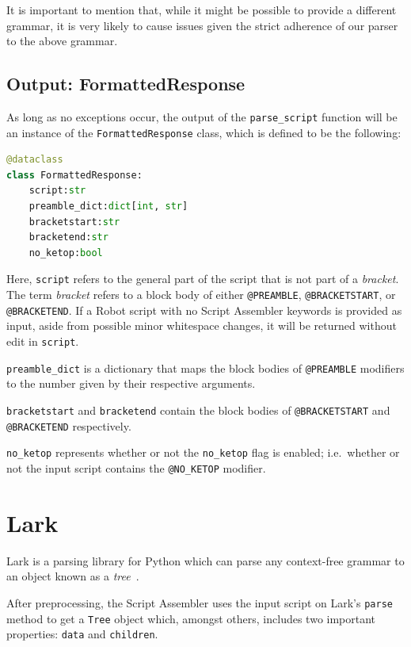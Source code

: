 It is important to mention that, while it might be possible to provide a different grammar, it is very likely to cause issues given the strict adherence of our parser to the above grammar. 

\subsection{Output: FormattedResponse}

As long as no exceptions occur, the output of the \verb|parse_script| function will be an instance of the \verb|FormattedResponse| class, which is defined to be the following:

\begin{lstlisting}[language=Python, caption={Class definition of \texttt{FormattedResponse}.}, label={lst:class_definition_parser_formatted_response}]
@dataclass
class FormattedResponse:
    script:str
    preamble_dict:dict[int, str]
    bracketstart:str
    bracketend:str
    no_ketop:bool 
\end{lstlisting}

Here, \verb|script| refers to the general part of the script that is not part of a \textit{bracket}. The term \textit{bracket} refers to a block body of either \verb|@PREAMBLE|, \verb|@BRACKETSTART|, or \verb|@BRACKETEND|. If a Robot script with no Script Assembler keywords is provided as input, aside from possible minor whitespace changes, it will be returned without edit in \verb|script|. 

\verb|preamble_dict| is a dictionary that maps the block bodies of \verb|@PREAMBLE| modifiers to the number given by their respective arguments. 

\verb|bracketstart| and \verb|bracketend| contain the block bodies of \verb|@BRACKETSTART| and\\
\verb|@BRACKETEND| respectively. 

\verb|no_ketop| represents whether or not the \verb|no_ketop| flag is enabled; i.e.\ whether or not the input script contains the \verb|@NO_KETOP| modifier.

\section{Lark}

Lark is a parsing library for Python which can parse any context-free grammar to an object known as a \textit{tree}~\cite{py-module-lark}.

After preprocessing, the Script Assembler uses the input script on Lark's \verb|parse| method to get a \verb|Tree| object which, amongst others, includes two important properties: \verb|data| and \verb|children|.

